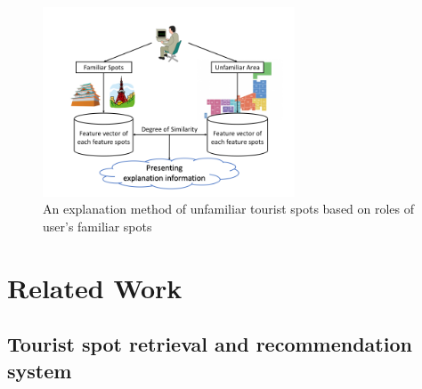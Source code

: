\documentclass[journal]{IAENGtran}
\begin{document}
\begin{figure}[t]
  \begin{center}
    \includegraphics[clip,width=7.5cm,bb=0 0 720 540]{picture/Photo_Image_eng.png}
    \caption{An explanation method of unfamiliar tourist spots based on roles of user's familiar spots}
    \label{fig:Photo_Image}
   \end{center}
\end{figure}


\section{Related Work}
\label{sec:Related Work}
\subsection{Tourist spot retrieval and recommendation system}
\label{subsec:Tourist spot retrieval and recommendation system}
\end{document}
